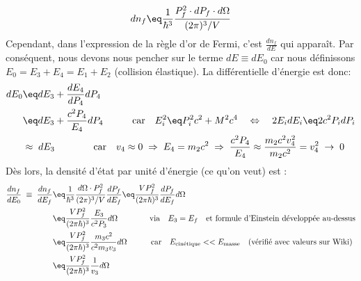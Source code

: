 \begin{equation*}
    dn_f \eq \frac{1}{\hbar^3}\frac{P^{2}_f \cdot dP_f \cdot d\Omega}{(2\pi)^3 / V}
\end{equation*}
 Cependant, dans l'expression de la règle d'or de Fermi, c'est $ \frac{dn_f}{dE}$ qui apparaît. Par conséquent, nous devons nous pencher sur le terme $dE\equiv dE_0$ car nous définissons $E_0 = E_3 + E_4 = E_1 + E_2$ (collision élastique). La différentielle d'énergie est donc:
\begin{align*}
    dE_0 
        &\eq 
    dE_3 + \dfrac{dE_4}{dP_4}dP_4\\
        &\eq
    dE_3 + \dfrac{c^2 P_4}{E_4}dP_4 
    \qquad \quad \text{car} \quad
    E_i^2 \eq P_i^2c^2 + M^2c^4
    \quad \Leftrightarrow \quad
    2E_idE_i \eq 2c^2 P_i dP_i\\
        &\approx\;
    dE_3  \qquad \qquad \text{car} \quad v_4 \approx 0 \;\Rightarrow\; E_4 = m_2c^2 \;\Rightarrow\; \dfrac{c^2P_4}{E_4} \approx \dfrac{m_2c^2v_4^2}{m_2c^2} = v_4^2 \;\rightarrow\; 0
\end{align*}
Dès lors, la densité d'état par unité d'énergie (ce qu'on veut) est :
\begin{align*}
    \dfrac{dn_f}{dE_0} \;\equiv\; \dfrac{dn_f}{dE_f}
        &\eq
    \frac{1}{\hbar^3}\frac{ d\Omega \cdot P^{2}_f}{(2\pi)^3 / V} \dfrac{dP_f}{dE_f}
    \eq
    \frac{V P_f^2}{(2\pi\hbar)^3} \dfrac{dP_f}{dE_f} d\Omega
    \\
        &\eq
    \frac{V P_f^2}{(2\pi\hbar)^3} \dfrac{E_3}{c^2P_3} d\Omega
    \qquad \qquad \text{via} \quad E_3=E_f \quad \text{et formule d'Einstein développée au-dessus} \\ 
        &\eq
    \frac{V P_f^2}{(2\pi\hbar)^3}\dfrac{m_3 c^2}{c^2 m_3 v_3}  d\Omega
    \qquad \quad \text{car} \quad E_{\text{cinétique}} << E_{\text{masse}} \quad \text{(vérifié avec valeurs sur Wiki)}\\
        &\eq
    \frac{V P_f^2}{(2\pi\hbar)^3}\dfrac{1}{v_3}  d\Omega
\end{align*}


